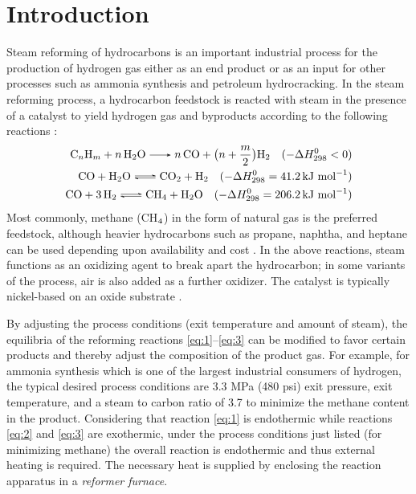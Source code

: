 \chapter{Introduction} \label{ch:introduction}

Steam reforming of hydrocarbons is an important industrial process for the production of hydrogen gas either as an end product or as an input for other processes such as ammonia synthesis and petroleum hydrocracking. In the steam reforming process, a hydrocarbon feedstock is reacted with steam in the presence of a catalyst to yield hydrogen gas and byproducts according to the following reactions \cite{rostrup-nielsen_catalytic_1984}:
\begin{align}
\ce{C_{n}H_{m} + n H2O -> n CO + } \bigl(n + \frac{m}{2}\bigr) \ce{H2} \quad (-\Delta{}H^{0}_{298} < 0) \label{eq:1} \\
\ce{CO + H2O <=> CO2 + H2} \quad (-\Delta{}H^{0}_{298} = 41.2 \, \text{kJ mol}^{-1}) \label{eq:2} \\
\ce{CO + 3H2 <=> CH4 + H2O} \quad (-\Delta{}H^{0}_{298} = 206.2 \, \text{kJ mol}^{-1}) \label{eq:3}
\end{align}
Most commonly, methane (CH$_{\textnormal{4}}$) in the form of natural gas is the preferred feedstock, although heavier hydrocarbons such as propane, naphtha, and heptane can be used depending upon availability and cost \cite{rostrup-nielsen_catalytic_1984,haussinger_hydrogen_2000}. In the above reactions, steam functions as an oxidizing agent to break apart the hydrocarbon; in some variants of the process, air is also added as a further oxidizer. The catalyst is typically nickel-based on an oxide substrate \cite{rostrup-nielsen_catalytic_1984}.

By adjusting the process conditions (exit temperature and amount of steam), the equilibria of the reforming reactions \ref{eq:1}--\ref{eq:3} can be modified to favor certain products and thereby adjust the composition of the product gas. For example, for ammonia synthesis which is one of the largest industrial consumers of hydrogen, the typical desired process conditions are 3.3 MPa (480 psi) exit pressure,  exit temperature, and a steam to carbon ratio of 3.7 \cite{rostrup-nielsen_catalytic_1984} to minimize the methane content in the product. Considering that reaction \ref{eq:1} is endothermic while reactions \ref{eq:2} and \ref{eq:3} are exothermic, under the process conditions just listed (for minimizing methane) the overall reaction is endothermic and thus external heating is required. The necessary heat is supplied by enclosing the reaction apparatus in a \emph{reformer furnace}.

